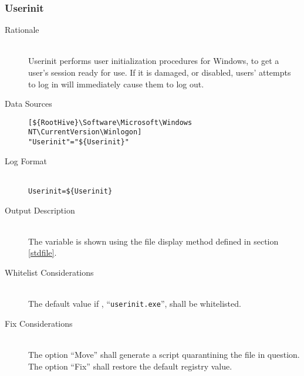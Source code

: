 \subsubsection{Userinit}
\begin{description}
\item[Rationale] \hfill \\
Userinit performs user initialization procedures for Windows, to get a user's
session ready for use. If it is damaged, or disabled, users' attempts to log in
will immediately cause them to log out.
\item[Data Sources] \hfill
\vspace{-\baselineskip}
\begin{verbatim}
[${RootHive}\Software\Microsoft\Windows NT\CurrentVersion\Winlogon]
"Userinit"="${Userinit}"
\end{verbatim}
\item[Log Format] \hfill \\
\verb|Userinit=${Userinit}|
\item[Output Description] \hfill \\
The variable  is shown using the file display method defined in
section \ref{stdfile}.
\item[Whitelist Considerations] \hfill \\
The default value if , ``\verb|userinit.exe|'', shall be whitelisted.
\item[Fix Considerations] \hfill \\
The option ``Move'' shall generate a script quarantining the file in question.
The option ``Fix'' shall restore the default registry value.
\end{description}

